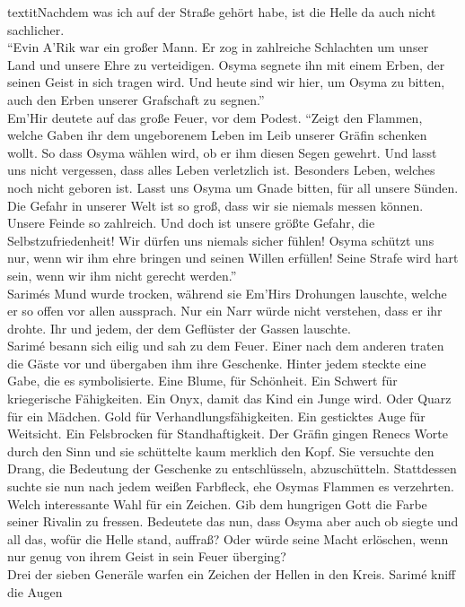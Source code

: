 textit{Nachdem was ich auf der Straße gehört habe, ist die Helle da auch nicht sachlicher.}\\
``Evin A'Rik war ein großer Mann. Er zog in zahlreiche Schlachten um unser Land und unsere Ehre 
zu verteidigen. Osyma segnete ihn mit einem Erben, der seinen Geist in sich tragen wird. Und heute 
sind wir hier, um Osyma zu bitten, auch den Erben unserer Grafschaft zu segnen.''\\
Em'Hir deutete auf das große Feuer, vor dem Podest. ``Zeigt den Flammen, welche Gaben ihr dem 
ungeborenem Leben im Leib unserer Gräfin schenken wollt. So dass Osyma wählen wird, ob er ihm 
diesen Segen gewehrt. Und lasst uns nicht vergessen, dass alles Leben verletzlich ist. Besonders 
Leben, welches noch nicht geboren ist. Lasst uns Osyma um Gnade bitten, für all unsere Sünden. 
Die Gefahr in unserer Welt ist so groß, dass wir sie niemals messen können. Unsere Feinde so 
zahlreich. Und doch ist unsere größte Gefahr, die Selbstzufriedenheit! Wir dürfen uns niemals 
sicher fühlen! Osyma schützt uns nur, wenn wir ihm ehre bringen und seinen Willen erfüllen! 
Seine Strafe wird hart sein, wenn wir ihm nicht gerecht werden.''\\
Sarimés Mund wurde trocken, während sie Em'Hirs Drohungen lauschte, welche er so offen vor allen 
aussprach. Nur ein Narr würde nicht verstehen, dass er ihr drohte. Ihr und jedem, der dem 
Geflüster der Gassen lauschte. \\
Sarimé besann sich eilig und sah zu dem Feuer. Einer nach dem anderen traten die Gäste vor und 
übergaben ihm ihre Geschenke. Hinter jedem steckte eine Gabe, die es symbolisierte. Eine Blume, für 
Schönheit. Ein Schwert für kriegerische Fähigkeiten. Ein Onyx, damit das Kind ein Junge wird. Oder 
Quarz für ein Mädchen. Gold für Verhandlungsfähigkeiten. Ein gesticktes Auge für Weitsicht. Ein 
Felsbrocken für Standhaftigkeit. Der Gräfin gingen Renecs Worte durch den Sinn und sie schüttelte 
kaum merklich den Kopf. Sie versuchte den Drang, die Bedeutung der Geschenke zu entschlüsseln, 
abzuschütteln. Stattdessen suchte sie nun nach jedem weißen Farbfleck, ehe Osymas Flammen es 
verzehrten. Welch interessante Wahl für ein Zeichen. Gib dem hungrigen Gott die Farbe seiner 
Rivalin zu fressen. Bedeutete das nun, dass Osyma aber auch ob siegte und all das, wofür die Helle 
stand, auffraß? Oder würde seine Macht erlöschen, wenn nur genug von ihrem Geist in sein Feuer 
überging?\\
Drei der sieben Generäle warfen ein Zeichen der Hellen in den Kreis. Sarimé kniff die Augen 
